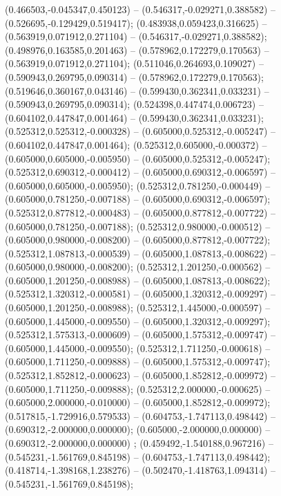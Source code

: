  (0.466503,-0.045347,0.450123) -- (0.546317,-0.029271,0.388582) -- (0.526695,-0.129429,0.519417);
 (0.483938,0.059423,0.316625) -- (0.563919,0.071912,0.271104) -- (0.546317,-0.029271,0.388582);
 (0.498976,0.163585,0.201463) -- (0.578962,0.172279,0.170563) -- (0.563919,0.071912,0.271104);
 (0.511046,0.264693,0.109027) -- (0.590943,0.269795,0.090314) -- (0.578962,0.172279,0.170563);
 (0.519646,0.360167,0.043146) -- (0.599430,0.362341,0.033231) -- (0.590943,0.269795,0.090314);
 (0.524398,0.447474,0.006723) -- (0.604102,0.447847,0.001464) -- (0.599430,0.362341,0.033231);
 (0.525312,0.525312,-0.000328) -- (0.605000,0.525312,-0.005247) -- (0.604102,0.447847,0.001464);
 (0.525312,0.605000,-0.000372) -- (0.605000,0.605000,-0.005950) -- (0.605000,0.525312,-0.005247);
 (0.525312,0.690312,-0.000412) -- (0.605000,0.690312,-0.006597) -- (0.605000,0.605000,-0.005950);
 (0.525312,0.781250,-0.000449) -- (0.605000,0.781250,-0.007188) -- (0.605000,0.690312,-0.006597);
 (0.525312,0.877812,-0.000483) -- (0.605000,0.877812,-0.007722) -- (0.605000,0.781250,-0.007188);
 (0.525312,0.980000,-0.000512) -- (0.605000,0.980000,-0.008200) -- (0.605000,0.877812,-0.007722);
 (0.525312,1.087813,-0.000539) -- (0.605000,1.087813,-0.008622) -- (0.605000,0.980000,-0.008200);
 (0.525312,1.201250,-0.000562) -- (0.605000,1.201250,-0.008988) -- (0.605000,1.087813,-0.008622);
 (0.525312,1.320312,-0.000581) -- (0.605000,1.320312,-0.009297) -- (0.605000,1.201250,-0.008988);
 (0.525312,1.445000,-0.000597) -- (0.605000,1.445000,-0.009550) -- (0.605000,1.320312,-0.009297);
 (0.525312,1.575313,-0.000609) -- (0.605000,1.575312,-0.009747) -- (0.605000,1.445000,-0.009550);
 (0.525312,1.711250,-0.000618) -- (0.605000,1.711250,-0.009888) -- (0.605000,1.575312,-0.009747);
 (0.525312,1.852812,-0.000623) -- (0.605000,1.852812,-0.009972) -- (0.605000,1.711250,-0.009888);
 (0.525312,2.000000,-0.000625) -- (0.605000,2.000000,-0.010000) -- (0.605000,1.852812,-0.009972);
 (0.517815,-1.729916,0.579533) -- (0.604753,-1.747113,0.498442) -- (0.690312,-2.000000,0.000000);
 (0.605000,-2.000000,0.000000) -- (0.690312,-2.000000,0.000000) ;
 (0.459492,-1.540188,0.967216) -- (0.545231,-1.561769,0.845198) -- (0.604753,-1.747113,0.498442);
 (0.418714,-1.398168,1.238276) -- (0.502470,-1.418763,1.094314) -- (0.545231,-1.561769,0.845198);
